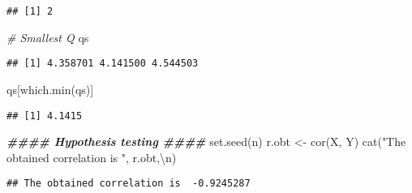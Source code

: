 \documentclass[
]{article}
\newenvironment{Shaded}{\begin{snugshade}}{\end{snugshade}}
\newcommand{\CommentTok}[1]{\textcolor[rgb]{0.56,0.35,0.01}{\textit{#1}}}
\newcommand{\DocumentationTok}[1]{\textcolor[rgb]{0.56,0.35,0.01}{\textbf{\textit{#1}}}}
\newcommand{\FunctionTok}[1]{\textcolor[rgb]{0.00,0.00,0.00}{#1}}
\newcommand{\NormalTok}[1]{#1}
\newcommand{\OtherTok}[1]{\textcolor[rgb]{0.56,0.35,0.01}{#1}}
\newcommand{\SpecialCharTok}[1]{\textcolor[rgb]{0.00,0.00,0.00}{#1}}
\newcommand{\StringTok}[1]{\textcolor[rgb]{0.31,0.60,0.02}{#1}}
\begin{document}
\begin{verbatim}
## [1] 2
\end{verbatim}

\begin{Shaded}
\begin{Highlighting}[]
\CommentTok{\# Smallest Q}
\NormalTok{qs}
\end{Highlighting}
\end{Shaded}

\begin{verbatim}
## [1] 4.358701 4.141500 4.544503
\end{verbatim}

\begin{Shaded}
\begin{Highlighting}[]
\NormalTok{qs[}\FunctionTok{which.min}\NormalTok{(qs)]}
\end{Highlighting}
\end{Shaded}

\begin{verbatim}
## [1] 4.1415
\end{verbatim}

\begin{Shaded}
\begin{Highlighting}[]
\DocumentationTok{\#\#\#\# Hypothesis testing \#\#\#\#}
\FunctionTok{set.seed}\NormalTok{(n)}
\NormalTok{r.obt }\OtherTok{\textless{}{-}} \FunctionTok{cor}\NormalTok{(X, Y)}
\FunctionTok{cat}\NormalTok{(}\StringTok{"The obtained correlation is "}\NormalTok{, r.obt,}\StringTok{\textquotesingle{}}\SpecialCharTok{\textbackslash{}n}\StringTok{\textquotesingle{}}\NormalTok{)}
\end{Highlighting}
\end{Shaded}

\begin{verbatim}
## The obtained correlation is  -0.9245287
\end{verbatim}
\end{document}
